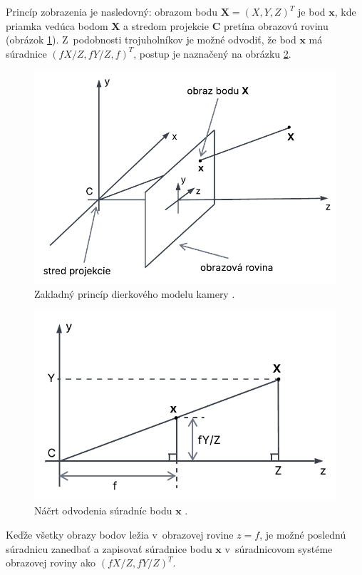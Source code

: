 Princíp zobrazenia je nasledovný: obrazom bodu $\mathbf{X} = (X, Y, Z)^T$ je bod $\mathbf{x}$, kde priamka vedúca bodom $\mathbf{X}$ a stredom projekcie $\mathbf{C}$ pretína obrazovú rovinu (obrázok \ref{fig:model_kamery1}). Z~podobnosti trojuholníkov je možné odvodiť, že bod $\mathbf{x}$ má súradnice $(fX/Z, fY/Z, f)^T$, postup je naznačený na obrázku \ref{fig:model_kamery2}.

\begin{figure}[h!]
    \centering
    \includegraphics[width=0.7\linewidth]{text_prace/obrazky-figures/model_kamery1.pdf}
    \caption{Zakladný princíp dierkového modelu kamery \cite{multiple_view_geometry}.}
    \label{fig:model_kamery1}
\end{figure}

\begin{figure}[h!]
    \centering
    \includegraphics[width=0.7\linewidth]{text_prace/obrazky-figures/model_kamery2.pdf}
    \caption{Náčrt odvodenia súradníc bodu $\mathbf{x}$ \cite{multiple_view_geometry}.}
    \label{fig:model_kamery2}
\end{figure}

Keďže všetky obrazy bodov ležia v~obrazovej rovine $z = f$, je možné poslednú súradnicu zanedbať a zapisovať súradnice bodu $\mathbf{x}$ v~súradnicovom systéme obrazovej roviny ako $(fX/Z, fY/Z)^T$.

